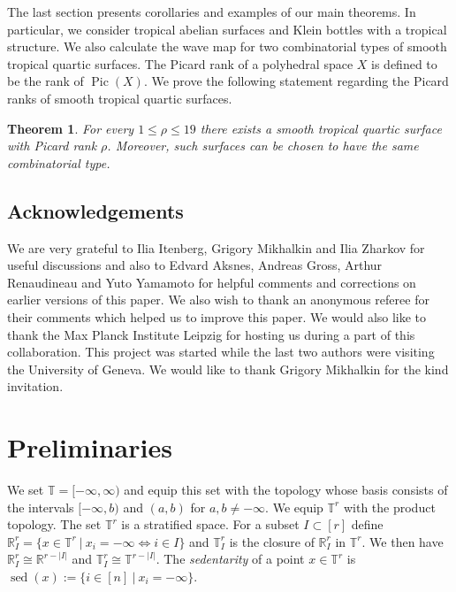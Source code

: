 \documentclass[11pt]{article}
\numberwithin{equation}{numsection}
\newcommand{\R}{{\mathbb R}}
\newcommand{\TT}{{\mathbb T}}
\newcommand{\T}{{\mathbb T}}
\DeclareMathOperator{\Pic}{Pic}
\DeclareMathOperator{\sed}{sed}
\newtheorem{thm}{Theorem}[section]
\begin{document}
The last section presents corollaries and examples of our main theorems. In particular, we consider tropical abelian surfaces and Klein bottles with a tropical structure.   We also calculate the wave map for two combinatorial types of smooth tropical quartic  surfaces. The Picard rank  of a polyhedral space $X$ is defined  to be  the rank of $\Pic(X)$. 
We prove the following statement  regarding the Picard ranks of smooth tropical quartic surfaces. 

\begin{thm}\label{Prop Intro}
For every $1 \leq \rho \leq 19$ there exists a smooth tropical quartic surface with Picard rank $\rho$. Moreover, such surfaces can be chosen to have the same combinatorial type. 
\end{thm}




\subsection*{Acknowledgements}

We are very grateful to  Ilia Itenberg, Grigory Mikhalkin and Ilia Zharkov for useful discussions and also to 
Edvard Aksnes, Andreas Gross, Arthur Renaudineau and Yuto Yamamoto for helpful comments and 
corrections on earlier versions of this paper.
We also wish to thank an anonymous referee for their comments which helped us to improve this paper.
We would also like to thank the Max Planck Institute Leipzig for hosting us during a part of this collaboration. 
This project was started while the last two authors were visiting the University of Geneva. 
We would like to thank Grigory Mikhalkin for the kind invitation.



\section{Preliminaries}


We set $\TT = [-\infty, \infty)$ and equip this set with the topology whose basis consists of the intervals 
$[-\infty , b)$ and $(a, b)$ for $a,b \neq -\infty$. We equip $\TT^r$ with the product topology. 
The set $\TT^r$ is a stratified space. For a subset $I \subset [r]$ define 
$\R^r_I  = \{x \in \TT^r \ | \ x_i = -\infty \Leftrightarrow i \in I\}$ and 
$\T^r_I$ is the closure of $\R^r_I$ in $\TT^r$. 
We then have $\R^r_I \cong \R^{r-|I|}$ and $\TT_I^r \cong \TT^{r-|I|}$. The \emph{sedentarity} of a point  
$x \in \TT^r$ is  $\sed(x) := \{ i \in [n] \ | \ x_i = -\infty\}$. 
\end{document}
